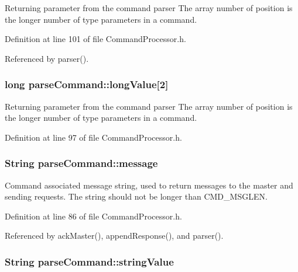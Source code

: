 Returning parameter from the command parser The array number of position is the longer number of type parameters in a command. 



Definition at line 101 of file Command\-Processor.\-h.



Referenced by parser().

\hypertarget{structparse_command_a10deac33dc255dd8a8b84532bbeb6c42}{
\subsubsection[{long\-Value}]{\setlength{\rightskip}{0pt plus 5cm}long parse\-Command\-::long\-Value\mbox{[}2\mbox{]}}}\label{structparse_command_a10deac33dc255dd8a8b84532bbeb6c42}


Returning parameter from the command parser The array number of position is the longer number of type parameters in a command. 



Definition at line 97 of file Command\-Processor.\-h.

\hypertarget{structparse_command_a5d2f84606922f34ad6a8ca5f7d8a59b5}{
\subsubsection[{message}]{\setlength{\rightskip}{0pt plus 5cm}String parse\-Command\-::message}}\label{structparse_command_a5d2f84606922f34ad6a8ca5f7d8a59b5}


Command associated message string, used to return messages to the master and sending requests. The string should not be longer than C\-M\-D\-\_\-\-M\-S\-G\-L\-E\-N. 



Definition at line 86 of file Command\-Processor.\-h.



Referenced by ack\-Master(), append\-Response(), and parser().

\hypertarget{structparse_command_ac5ece0b161e3fae794d08911247c0b1e}{
\subsubsection[{string\-Value}]{\setlength{\rightskip}{0pt plus 5cm}String parse\-Command\-::string\-Value}}\label{structparse_command_ac5ece0b161e3fae794d08911247c0b1e}


